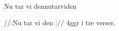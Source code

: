 \begin{song}{Nu tar vi den}{nutarviden}
\begin{vers}
//:Nu tar vi den :// 4ggr i tre verser.\\
\end{vers}
\end{song}
